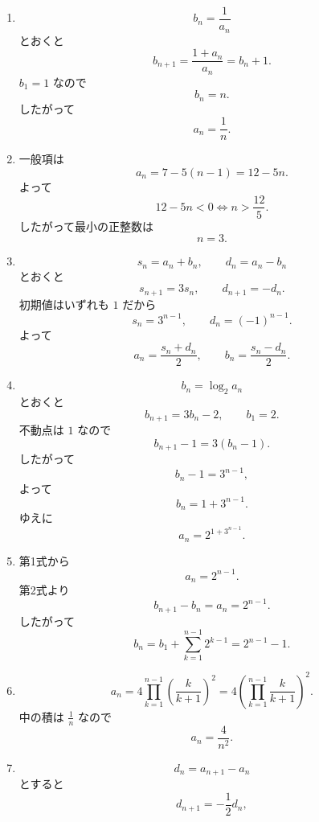\begin{enumerate}[label=\textbf{問\arabic*.},leftmargin=3.8em,format=\bookitemlink{practice-basic}{solution}{problem}]
\[            a_n=\frac2{n+1}.
          \]
        \item \[
            b_n=\frac1{a_n}
          \]
              とおくと
          \[
            b_{n+1}
            =\frac{1+a_n}{a_n}
            =b_n+1.
          \]
              \(b_1=1\) なので
          \[
            b_n=n.
          \]
              したがって
          \[
            a_n=\frac1n.
          \]
        \item 一般項は
          \[
            a_n=7-5(n-1)=12-5n.
          \]
              よって
          \[
            12-5n<0
            \iff n>\frac{12}{5}.
          \]
              したがって最小の正整数は
          \[
            n=3.
          \]
        \item \[
            s_n=a_n+b_n,\qquad d_n=a_n-b_n
          \]
              とおくと
          \[
            s_{n+1}=3s_n,
            \qquad
            d_{n+1}=-d_n.
          \]
              初期値はいずれも \(1\) だから
          \[
            s_n=3^{n-1},
            \qquad
            d_n=(-1)^{n-1}.
          \]
              よって
          \[
            a_n=\frac{s_n+d_n}{2},
            \qquad
            b_n=\frac{s_n-d_n}{2}.
          \]
        \item \[
            b_n=\log_2a_n
          \]
              とおくと
          \[
            b_{n+1}=3b_n-2,
            \qquad b_1=2.
          \]
              不動点は \(1\) なので
          \[
            b_{n+1}-1=3(b_n-1).
          \]
              したがって
          \[
            b_n-1=3^{n-1},
          \]
              よって
          \[
            b_n=1+3^{n-1}.
          \]
              ゆえに
          \[
            a_n=2^{1+3^{n-1}}.
          \]
        \item 第1式から
          \[
            a_n=2^{n-1}.
          \]
              第2式より
          \[
            b_{n+1}-b_n=a_n=2^{n-1}.
          \]
              したがって
          \[
            b_n
            =b_1+\sum_{k=1}^{n-1}2^{k-1}
            =2^{n-1}-1.
          \]
        \item \[
            a_n
            =4\prod_{k=1}^{n-1}
            \left(\frac{k}{k+1}\right)^2
            =4\left(
            \prod_{k=1}^{n-1}\frac{k}{k+1}
            \right)^2.
          \]
              中の積は \(\displaystyle \frac{1}{n}\) なので
          \[
            a_n=\frac4{n^2}.
          \]
        \item \[
            d_n=a_{n+1}-a_n
          \]
              とすると
          \[
            d_{n+1}=-\frac12d_n,
\]
\end{enumerate}
